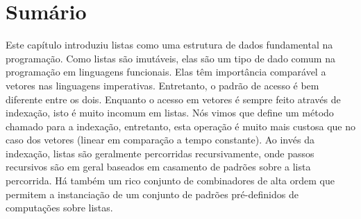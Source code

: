 \section{Sumário}

Este capítulo introduziu listas como uma estrutura de dados fundamental na programação. Como listas 
são imutáveis, elas são um tipo de dado comum na programação em linguagens funcionais. Elas têm 
importância comparável a vetores nas linguagens imperativas. Entretanto, o padrão de acesso é bem diferente 
entre os dois. Enquanto o acesso em vetores é sempre feito através de indexação, isto é muito incomum em 
listas. Nós vimos que  define um método chamado  para a indexação, entretanto, 
esta operação é muito mais custosa que no caso dos vetores (linear em comparação a tempo constante). Ao
invés da indexação, listas são geralmente percorridas recursivamente, onde passos recursivos são em geral
baseados em casamento de padrões sobre a lista percorrida. Há também um rico conjunto de combinadores de
alta ordem que permitem a instanciação de um conjunto de padrões pré-definidos de computações sobre listas.

